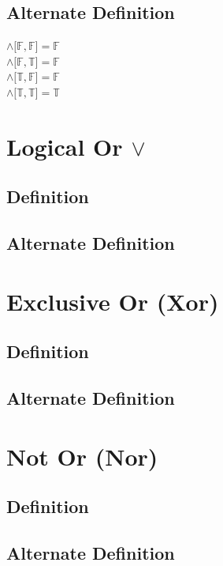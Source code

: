 \documentclass[11pt]{article}
\begin{document}
\subsection{Alternate Definition}
\begin{center}
$\land \lbrack\mathbb{F}, \mathbb{F}\rbrack = \mathbb{F}$ \\
$\land \lbrack\mathbb{F}, \mathbb{T}\rbrack = \mathbb{F}$ \\
$\land \lbrack\mathbb{T}, \mathbb{F}\rbrack = \mathbb{F}$ \\
$\land \lbrack\mathbb{T}, \mathbb{T}\rbrack = \mathbb{T}$ \\
\end{center}




\section{Logical Or $\lor$}
\subsection{Definition}
\subsection{Alternate Definition}



\section{Exclusive Or (Xor)}
\subsection{Definition}
\subsection{Alternate Definition}




\section{Not Or (Nor)}
\subsection{Definition}
\subsection{Alternate Definition}
\end{document}
